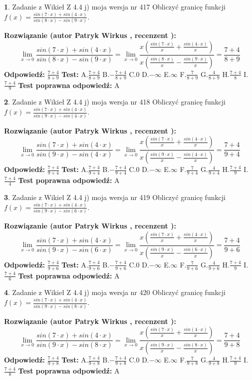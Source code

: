 \documentclass[12pt, a4paper]{article}
\theoremstyle{definition} %
\newtheorem{zad}{}
\newcommand{\zadStart}[1]{\begin{zad}#1\newline}
\newcommand{\zadStop}{\end{zad}}
\newcommand{\rozwStart}[2]{\noindent \textbf{Rozwiązanie (autor #1 , recenzent #2): }\newline}
\newcommand{\rozwStop}{\newline}
\newcommand{\odpStart}{\noindent \textbf{Odpowiedź:}\newline}
\newcommand{\odpStop}{\newline}
\newcommand{\testStart}{\noindent \textbf{Test:}\newline}
\newcommand{\testStop}{\newline}
\newcommand{\kluczStart}{\noindent \textbf{Test poprawna odpowiedź:}\newline}
\newcommand{\kluczStop}{\newline}
\begin{document}
\zadStart{Zadanie z Wikieł Z 4.4 j) moja wersja nr 417}
Obliczyć granicę funkcji $f(x)=\frac{sin(7\cdot x) +sin(4\cdot x)}{sin(8\cdot x) -sin(9\cdot x)}$.
\zadStop
\rozwStart{Patryk Wirkus}{}
$$\lim\limits_{x\to 0}\frac{sin(7\cdot x) +sin(4\cdot x)}{sin(8\cdot x) -sin(9\cdot x)}=\lim\limits_{x\to 0}\frac{x(\frac{sin(7\cdot x)}{x}+\frac{sin(4\cdot x)}{x})}{x(\frac{sin(8\cdot x)}{x}-\frac{sin(9\cdot x)}{x})}=\frac{7+4}{8+9}$$
\rozwStop
\odpStart
$\frac{7+4}{8+9}$
\odpStop
\testStart
A.$\frac{7+4}{8+9}$
B.$-\frac{7+4}{8+9}$
C.$0$
D.$-\infty$
E.$\infty$
F.$\frac{7}{8+9}$
G.$\frac{4}{8+9}$
H.$\frac{7+4}{8}$
I.$\frac{7+4}{9}$
\testStop
\kluczStart
A
\kluczStop



\zadStart{Zadanie z Wikieł Z 4.4 j) moja wersja nr 418}
Obliczyć granicę funkcji $f(x)=\frac{sin(7\cdot x) +sin(4\cdot x)}{sin(9\cdot x) -sin(4\cdot x)}$.
\zadStop
\rozwStart{Patryk Wirkus}{}
$$\lim\limits_{x\to 0}\frac{sin(7\cdot x) +sin(4\cdot x)}{sin(9\cdot x) -sin(4\cdot x)}=\lim\limits_{x\to 0}\frac{x(\frac{sin(7\cdot x)}{x}+\frac{sin(4\cdot x)}{x})}{x(\frac{sin(9\cdot x)}{x}-\frac{sin(4\cdot x)}{x})}=\frac{7+4}{9+4}$$
\rozwStop
\odpStart
$\frac{7+4}{9+4}$
\odpStop
\testStart
A.$\frac{7+4}{9+4}$
B.$-\frac{7+4}{9+4}$
C.$0$
D.$-\infty$
E.$\infty$
F.$\frac{7}{9+4}$
G.$\frac{4}{9+4}$
H.$\frac{7+4}{9}$
I.$\frac{7+4}{4}$
\testStop
\kluczStart
A
\kluczStop



\zadStart{Zadanie z Wikieł Z 4.4 j) moja wersja nr 419}
Obliczyć granicę funkcji $f(x)=\frac{sin(7\cdot x) +sin(4\cdot x)}{sin(9\cdot x) -sin(6\cdot x)}$.
\zadStop
\rozwStart{Patryk Wirkus}{}
$$\lim\limits_{x\to 0}\frac{sin(7\cdot x) +sin(4\cdot x)}{sin(9\cdot x) -sin(6\cdot x)}=\lim\limits_{x\to 0}\frac{x(\frac{sin(7\cdot x)}{x}+\frac{sin(4\cdot x)}{x})}{x(\frac{sin(9\cdot x)}{x}-\frac{sin(6\cdot x)}{x})}=\frac{7+4}{9+6}$$
\rozwStop
\odpStart
$\frac{7+4}{9+6}$
\odpStop
\testStart
A.$\frac{7+4}{9+6}$
B.$-\frac{7+4}{9+6}$
C.$0$
D.$-\infty$
E.$\infty$
F.$\frac{7}{9+6}$
G.$\frac{4}{9+6}$
H.$\frac{7+4}{9}$
I.$\frac{7+4}{6}$
\testStop
\kluczStart
A
\kluczStop



\zadStart{Zadanie z Wikieł Z 4.4 j) moja wersja nr 420}
Obliczyć granicę funkcji $f(x)=\frac{sin(7\cdot x) +sin(4\cdot x)}{sin(9\cdot x) -sin(8\cdot x)}$.
\zadStop
\rozwStart{Patryk Wirkus}{}
$$\lim\limits_{x\to 0}\frac{sin(7\cdot x) +sin(4\cdot x)}{sin(9\cdot x) -sin(8\cdot x)}=\lim\limits_{x\to 0}\frac{x(\frac{sin(7\cdot x)}{x}+\frac{sin(4\cdot x)}{x})}{x(\frac{sin(9\cdot x)}{x}-\frac{sin(8\cdot x)}{x})}=\frac{7+4}{9+8}$$
\rozwStop
\odpStart
$\frac{7+4}{9+8}$
\odpStop
\testStart
A.$\frac{7+4}{9+8}$
B.$-\frac{7+4}{9+8}$
C.$0$
D.$-\infty$
E.$\infty$
F.$\frac{7}{9+8}$
G.$\frac{4}{9+8}$
H.$\frac{7+4}{9}$
I.$\frac{7+4}{8}$
\testStop
\kluczStart
A
\kluczStop
\end{document}
